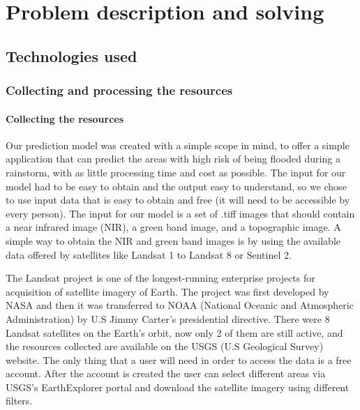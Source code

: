 \documentclass[12pt, a4paper]{report}
\begin{document}
\newpage{}


\chapter{Problem description and solving}

\section{Technologies used}

\subsection{Collecting and processing the resources}

\subsubsection{Collecting the resources}

\quad
Our prediction model was created with a simple scope in mind, to offer a simple  application that can predict the areas with high risk of being flooded during a rainstorm, with as little processing time and cost as possible. The input for our model had to be easy to obtain and the output easy to understand, so we chose to use input data that is easy to obtain and free (it will need to be accessible by every person). The input for our model is a set of .tiff images that should contain a near infrared image (NIR), a green band image, and a topographic image. A simple way to obtain the NIR and green band images is by using the available data offered by satellites like Landsat 1 to Landsat 8 or Sentinel 2. 

\par 
The Landsat project is one of the longest-running enterprise projects for acquisition of satellite imagery of Earth. The project was first developed by NASA and then it was transferred to NOAA (National Oceanic and Atmospheric Administration) by U.S Jimmy Carter's presidential directive. There were 8 Landsat satellites on the Earth's orbit, now only 2 of them are still active, and the resources collected are available on the USGS (U.S Geological Survey) website. The only thing that a user will need in order to access the data is a free account. After the account is created the user can select different areas via USGS's EarthExplorer portal and download the satellite imagery using different filters.
\par
\end{document}
